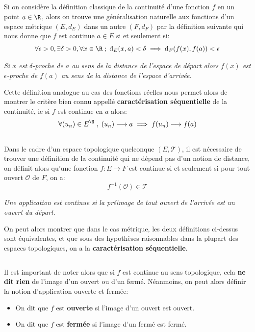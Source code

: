 \subsection*{}
Si on considère la définition classique de la continuité d'une fonction \(f\) en un point \(a \in \R\), alors on trouve une généralisation naturelle aux fonctions d'un espace métrique \((E, d_E)\) dans un autre \((F, d_F)\) par la définition suivante qui nous donne que \(f\) est continue \(a \in E\) si et seulement si:
\[
   \forall \epsilon > 0 , \exists \delta > 0 , \forall x \in \R \; ; \; \text{d}_E(x, a) < \delta  \implies  \text{d}_F(f(x), f(a)) < \epsilon
\]
\begin{center}
   \textit{Si \(x\) est \(\delta\)-proche de \(a\) au sens de la distance de l'espace de départ alors \(f(x)\) est \(\epsilon\)-proche de \(f(a)\) au sens de la distance de l'espace d'arrivée.}
\end{center}
Cette définition analogue au cas des fonctions réelles nous permet alors de montrer le critère bien connu appellé \textbf{caractérisation séquentielle} de la continuité, ie si \(f\) est continue en \(a\) alors:
\[
   \forall (u_n) \in E^\N \; , \; (u_n) \longrightarrow a \implies f(u_n) \longrightarrow f(a)
\]
\subsection*{}
Dans le cadre d'un espace topologique quelconque \((E, \mathcal{T})\), il est nécessaire de trouver une définition de la continuité qui ne dépend pas d'un notion de distance, on définit alors qu'une fonction \(f : E \longrightarrow F\) est continue si et seulement si pour tout ouvert \(\mathcal{O}\) de \(F\), on a:
\[
   f^{-1}(\mathcal{O}) \in \mathcal{T}   
\]
\begin{center}
   \textit{Une application est continue si la préimage de tout ouvert de l'arrivée est un ouvert du départ.}
\end{center}
On peut alors montrer que dans le cas métrique, les deux définitions ci-dessus sont équivalentes, et que sous des hypothèses raisonnables dans la plupart des espaces topologiques, on a la \textbf{caractérisation séquentielle}.
\subsection*{}
Il est important de noter alors que si \(f\) est continue au sens topologique, cela \textbf{ne dit rien} de l'image d'un ouvert ou d'un fermé. Néanmoins, on peut alors définir la notion d'application ouverte et fermée:
\begin{itemize}
   \item On dit que \(f\) est \textbf{ouverte} si l'image d'un ouvert est ouvert.
   \item On dit que \(f\) est \textbf{fermée} si l'image d'un fermé est fermé.
\end{itemize}
